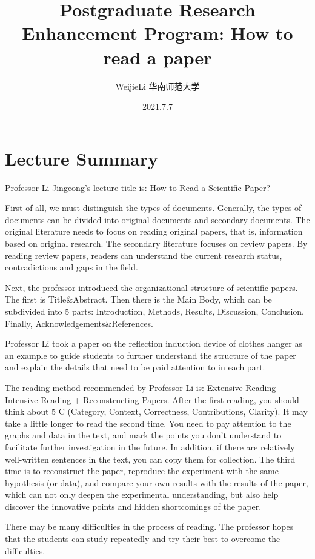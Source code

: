 \documentclass[UTF-8]{ctexart}
\title{Postgraduate Research Enhancement Program: How to read a paper}
\author{WeijieLi \quad 华南师范大学}
\date{2021.7.7}
\begin{document}
\maketitle
\thispagestyle{empty}
\clearpage

\pagestyle{plain}
\setcounter{page}{1}

\section{Lecture Summary}
Professor Li Jingcong’s lecture title is: How to Read a Scientific Paper? 

First of all, we must distinguish the types of documents. Generally, the types of documents can be divided into original documents and secondary documents. The original literature needs to focus on reading original papers, that is, information based on original research. The secondary literature focuses on review papers. By reading review papers, readers can understand the current research status, contradictions and gaps in the field. 

Next, the professor introduced the organizational structure of scientific papers. The first is Title\&Abstract. Then there is the Main Body, which can be subdivided into 5 parts: Introduction, Methods, Results, Discussion, Conclusion. Finally, Acknowledgements\&References.

Professor Li took a paper on the reflection induction device of clothes hanger as an example to guide students to further understand the structure of the paper and explain the details that need to be paid attention to in each part. 

The reading method recommended by Professor Li is: Extensive Reading + Intensive Reading + Reconstructing Papers. After the first reading, you should think about 5 C (Category, Context, Correctness, Contributions, Clarity). It may take a little longer to read the second time. You need to pay attention to the graphs and data in the text, and mark the points you don't understand to facilitate further investigation in the future. In addition, if there are relatively well-written sentences in the text, you can copy them for collection. The third time is to reconstruct the paper, reproduce the experiment with the same hypothesis (or data), and compare your own results with the results of the paper, which can not only deepen the experimental understanding, but also help discover the innovative points and hidden shortcomings of the paper. 

There may be many difficulties in the process of reading. The professor hopes that the students can study repeatedly and try their best to overcome the difficulties. 
\end{document}

